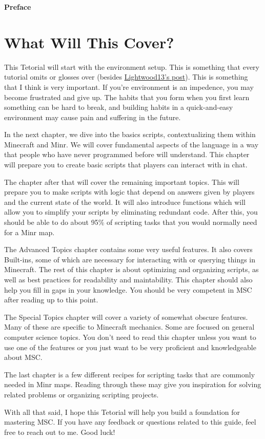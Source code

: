 \documentclass[oneside]{book}
\newcommand{\prefacename}{Preface}
\newenvironment{preface}{
    \vspace*{\stretch{2}}
    {\noindent \bfseries \Huge \prefacename}
    \begin{center}
        \phantomsection \addcontentsline{toc}{chapter}{\prefacename} %
        \thispagestyle{plain}
    \end{center}%
}
{\vspace*{\stretch{5}}}
\begin{document}
\begin{preface}
\section*{What Will This Cover?}
This Tetorial will start with the environment setup. This is something that every tutorial omits or glosses over (besides \href{https://forums.minr.org/threads/visual-studio-code-extension-for-minr-scripts.6175/}{Lightwood13's post}). This is something that I think is very important. If you're environment is an impedence, you may become frustrated and give up. The habits that you form when you first learn something can be hard to break, and building habits in a quick-and-easy environment may cause pain and suffering in the future.

In the next chapter, we dive into the basics scripts, contextualizing them within Minecraft and Minr. We will cover fundamental aspects of the language in a way that people who have never programmed before will understand. This chapter will prepare you to create basic scripts that players can interact with in chat.

The chapter after that will cover the remaining important topics. This will prepare you to make scripts with logic that depend on answers given by players and the current state of the world. It will also introduce functions which will allow you to simplify your scripts by eliminating redundant code. After this, you should be able to do about 95\% of scripting tasks that you would normally need for a Minr map.

The Advanced Topics chapter contains some very useful features. It also covers Built-ins, some of which are necessary for interacting with or querying things in Minecraft. The rest of this chapter is about optimizing and organizing scripts, as well as best practices for readability and maintability. This chapter should also help you fill in gaps in your knowledge. You should be very competent in MSC after reading up to this point.

The Special Topics chapter will cover a variety of somewhat obscure features. Many of these are specific to Minecraft mechanics. Some are focused on general computer science topics. You don't need to read this chapter unless you want to use one of the features or you just want to be very proficient and knowledgeable about MSC.

The last chapter is a few different recipes for scripting tasks that are commonly needed in Minr maps. Reading through these may give you inspiration for solving related problems or organizing scripting projects.

With all that said, I hope this Tetorial will help you build a foundation for mastering MSC. If you have any feedback or questions related to this guide, feel free to reach out to me. Good luck!

\end{preface}
\end{document}
